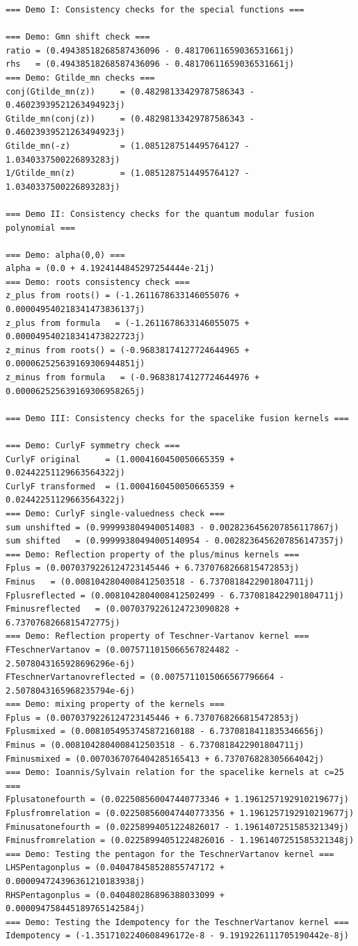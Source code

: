 \documentclass[11pt]{article}
\begin{document}
\begin{lstlisting}
=== Demo I: Consistency checks for the special functions ===

=== Demo: Gmn shift check ===
ratio = (0.49438518268587436096 - 0.48170611659036531661j)
rhs   = (0.49438518268587436096 - 0.48170611659036531661j)
=== Demo: Gtilde_mn checks ===
conj(Gtilde_mn(z))     = (0.48298133429787586343 - 0.46023939521263494923j)
Gtilde_mn(conj(z))     = (0.48298133429787586343 - 0.46023939521263494923j)
Gtilde_mn(-z)          = (1.0851287514495764127 - 1.0340337500226893283j)
1/Gtilde_mn(z)         = (1.0851287514495764127 - 1.0340337500226893283j)

=== Demo II: Consistency checks for the quantum modular fusion polynomial ===

=== Demo: alpha(0,0) ===
alpha = (0.0 + 4.1924144845297254444e-21j)
=== Demo: roots consistency check ===
z_plus from roots() = (-1.2611678633146055076 + 0.000049540218341473836137j)
z_plus from formula   = (-1.2611678633146055075 + 0.000049540218341473822723j)
z_minus from roots() = (-0.96838174127724644965 + 0.000062525639169306944851j)
z_minus from formula   = (-0.96838174127724644976 + 0.000062525639169306958265j)

=== Demo III: Consistency checks for the spacelike fusion kernels ===

=== Demo: CurlyF symmetry check ===
CurlyF original     = (1.0004160450050665359 + 0.02442251129663564322j)
CurlyF transformed  = (1.0004160450050665359 + 0.02442251129663564322j)
=== Demo: CurlyF single-valuedness check ===
sum unshifted = (0.9999938049400514083 - 0.0028236456207856117867j)
sum shifted   = (0.99999380494005140954 - 0.0028236456207856147357j)
=== Demo: Reflection property of the plus/minus kernels ===
Fplus = (0.0070379226124723145446 + 6.7370768266815472853j)
Fminus   = (0.0081042804008412503518 - 6.7370818422901804711j)
Fplusreflected = (0.0081042804008412502499 - 6.7370818422901804711j)
Fminusreflected   = (0.0070379226124723090828 + 6.7370768266815472775j)
=== Demo: Reflection property of Teschner-Vartanov kernel ===
FTeschnerVartanov = (0.0075711015066567824482 - 2.5078043165928696296e-6j)
FTeschnerVartanovreflected = (0.0075711015066567796664 - 2.5078043165968235794e-6j)
=== Demo: mixing property of the kernels ===
Fplus = (0.0070379226124723145446 + 6.7370768266815472853j)
Fplusmixed = (0.0081054953745872160188 - 6.7370818411835346656j)
Fminus = (0.0081042804008412503518 - 6.7370818422901804711j)
Fminusmixed = (0.0070367076404285165413 + 6.737076828305664042j)
=== Demo: Ioannis/Sylvain relation for the spacelike kernels at c=25 ===
Fplusatonefourth = (0.022508560047440773346 + 1.1961257192910219677j)
Fplusfromrelation = (0.022508560047440773356 + 1.1961257192910219677j)
Fminusatonefourth = (0.02258994051224826017 - 1.1961407251585321349j)
Fminusfromrelation = (0.02258994051224826016 - 1.1961407251585321348j)
=== Demo: Testing the pentagon for the TeschnerVartanov kernel ===
LHSPentagonplus = (0.040478458528855747172 + 0.000094724396361210183938j)
RHSPentagonplus = (0.040480286896388033099 + 0.000094758445189765142584j)
=== Demo: Testing the Idempotency for the TeschnerVartanov kernel ===
Idempotency = (-1.3517102240608496172e-8 - 9.1919226111705190442e-8j)


\end{lstlisting}
\end{document}
